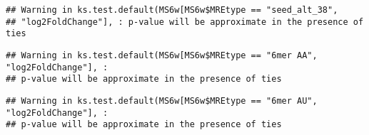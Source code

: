 \documentclass[
]{article}
\newenvironment{Shaded}{\begin{snugshade}}{\end{snugshade}}
\newcommand{\FunctionTok}[1]{\textcolor[rgb]{0.13,0.29,0.53}{\textbf{#1}}}
\newcommand{\NormalTok}[1]{#1}
\newcommand{\OtherTok}[1]{\textcolor[rgb]{0.56,0.35,0.01}{#1}}
\newcommand{\SpecialCharTok}[1]{\textcolor[rgb]{0.81,0.36,0.00}{\textbf{#1}}}
\newcommand{\StringTok}[1]{\textcolor[rgb]{0.31,0.60,0.02}{#1}}
\begin{document}
\begin{verbatim}
## Warning in ks.test.default(MS6w[MS6w$MREtype == "seed_alt_38",
## "log2FoldChange"], : p-value will be approximate in the presence of ties
\end{verbatim}

\begin{Shaded}
\end{Shaded}

\begin{verbatim}
## Warning in ks.test.default(MS6w[MS6w$MREtype == "6mer AA", "log2FoldChange"], :
## p-value will be approximate in the presence of ties
\end{verbatim}

\begin{Shaded}
\end{Shaded}

\begin{verbatim}
## Warning in ks.test.default(MS6w[MS6w$MREtype == "6mer AU", "log2FoldChange"], :
## p-value will be approximate in the presence of ties
\end{verbatim}
\end{document}
